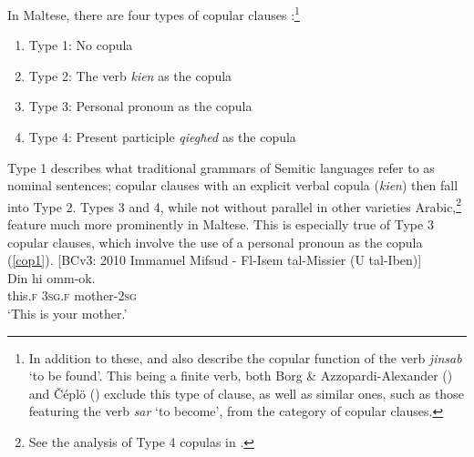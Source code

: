 \documentclass[output=paper]{langsci/langscibook}
\begin{document}
 \label{Copular} %
In Maltese, there are four types of copular clauses \citep[53]{BorgAzzopardi-Alexander1997}:\footnote{In addition to these, \cite{Borg1987} and \cite{borgspagnol2015} also describe the copular function of the verb \textit{jinsab} `to be found'. This being a finite verb, both Borg \& Azzopardi-Alexander (\citeyear[53]{BorgAzzopardi-Alexander1997}) and Čéplö (\citeyear[99--104]{bulbul2018}) exclude this type of clause, as well as similar ones, such as those featuring the verb \textit{sar} `to become', from the category of copular clauses.}
\begin{enumerate}[noitemsep]
	\item[] Type 1: No copula
    \item[] Type 2: The verb \textit{kien} as the copula
	\item[] Type 3: Personal pronoun as the copula
	\item[] Type 4: Present participle \textit{qiegħed} as the copula	
\end{enumerate}
Type 1 describes what traditional grammars of Semitic languages refer to as nominal sentences; copular clauses with an explicit verbal copula (\textit{kien}) then fall into Type 2. Types 3 and 4, while not without parallel in other varieties Arabic,\footnote{See the analysis of Type 4 copulas in \cite{camillerisadler2018}.} feature much more prominently in Maltese. This is especially true of Type 3 copular clauses, which involve the use of a personal pronoun as the copula (\ref{cop1}). 
\ea\label{cop1} 
{[BCv3: 2010 Immanuel Mifsud - Fl-Isem tal-Missier (U tal-Iben)]}\\
\gll Din hi omm-ok.\\
	this.\textsc{f} \textsc{3sg.f} mother-\textsc{2sg}\\
	\glt `This is your mother.'\\
\z
\end{document}
